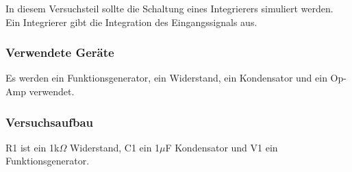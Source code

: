 \documentclass[12pt,a4paper]{article}
\begin{document}
In diesem Versuchsteil sollte die Schaltung eines Integrierers simuliert werden. Ein Integrierer gibt die Integration des Eingangssignals aus.

\subsubsection{Verwendete Geräte}

Es werden ein Funktionsgenerator, ein Widerstand, ein Kondensator und ein Op-Amp verwendet.


\subsubsection{Versuchsaufbau}

R1 ist ein 1k$\Omega$ Widerstand, C1 ein 1$\mu$F Kondensator und V1 ein Funktionsgenerator.
\end{document}
